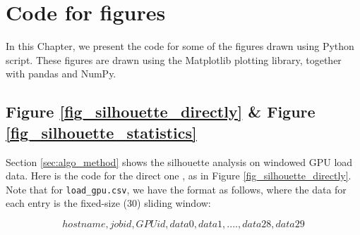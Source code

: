 \chapter{Code for figures}
In this Chapter, we present the code for some of the figures drawn using Python script. These figures are drawn using the Matplotlib plotting library, together with pandas and NumPy.

\section{Figure \ref{fig_silhouette_directly} \& Figure \ref{fig_silhouette_statistics}}
Section \ref{sec:algo_method} shows the silhouette analysis on windowed GPU load data. Here is the code for the direct one \cite{figure_silhouette}, as in Figure \ref{fig_silhouette_directly}. Note that for \texttt{load\_gpu.csv}, we have the format as follows, where the data for each entry is the fixed-size (30) sliding window:

\begin{equation*}
hostname,job id,GPU id,data 0,data 1,....,data 28,data 29
\end{equation*}


